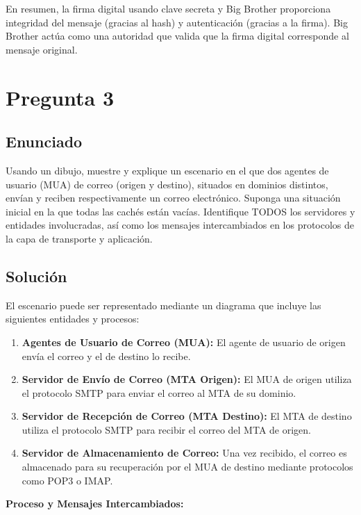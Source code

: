 \documentclass[12pt]{article}
\begin{document}
En resumen, la firma digital usando clave secreta y Big Brother proporciona integridad del mensaje (gracias al hash) y autenticación (gracias a la firma). Big Brother actúa como una autoridad que valida que la firma digital corresponde al mensaje original.

\section{Pregunta 3}

\subsection{Enunciado}
Usando un dibujo, muestre y explique un escenario en el que dos agentes de usuario (MUA) de correo (origen y destino), situados en dominios distintos, envían y reciben respectivamente un correo electrónico. Suponga una situación inicial en la que todas las cachés están vacías. Identifique TODOS los servidores y entidades involucradas, así como los mensajes intercambiados en los protocolos de la capa de transporte y aplicación.

\subsection{Solución}
El escenario puede ser representado mediante un diagrama que incluye las siguientes entidades y procesos:

\begin{enumerate}
    \item \textbf{Agentes de Usuario de Correo (MUA):} El agente de usuario de origen envía el correo y el de destino lo recibe.
    \item \textbf{Servidor de Envío de Correo (MTA Origen):} El MUA de origen utiliza el protocolo SMTP para enviar el correo al MTA de su dominio.
    \item \textbf{Servidor de Recepción de Correo (MTA Destino):} El MTA de destino utiliza el protocolo SMTP para recibir el correo del MTA de origen.
    \item \textbf{Servidor de Almacenamiento de Correo:} Una vez recibido, el correo es almacenado para su recuperación por el MUA de destino mediante protocolos como POP3 o IMAP.
\end{enumerate}

\textbf{Proceso y Mensajes Intercambiados:}
\end{document}
